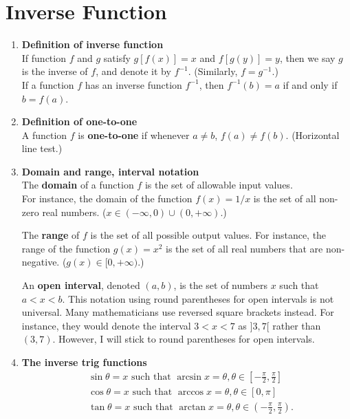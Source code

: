 \section{Inverse Function}
\begin{enumerate}
    \item \textbf{Definition of inverse function}\\
        \indent If function \(f\) and \(g\) satisfy \(g[f(x)]=x\) and \(f[g(y)]=y\), then we say \(g\) is the inverse of \(f\), and denote it by \(f^{-1}\). (Similarly, \(f=g^{-1}\).)\\
        \indent If a function \(f\) has an inverse function \(f^{-1}\), then \(f^{-1}(b)=a\) if and only if \(b=f(a)\).
    \item \textbf{Definition of one-to-one}\\
        \indent A function \(f\) is \textbf{one-to-one} if whenever \(a\neq b\), \(f(a)\neq f(b)\). (Horizontal line test.)
    \item \textbf{Domain and range, interval notation}\\
        \indent The \textbf{domain} of a function \(f\) is the set of allowable input values.\\
        \indent For instance, the domain of the function \(f(x)=1/x\) is the set of all non-zero real numbers. (\(x\in(-\infty,0)\cup(0,+\infty)\).)\par
        The \textbf{range} of \(f\) is the set of all possible output values. For instance, the range of the function \(g(x)=x^2\) is the set of all real numbers that are non-negative. (\(g(x)\in[0,+\infty)\).)\par
        An \textbf{open interval}, denoted \((a,b)\), is the set of numbers \(x\) such that \(a<x<b\). This notation using round parentheses for open intervals is not universal. Many mathematicians use reversed square brackets instead. For instance, they would denote the interval \(3<x<7\) as \(]3,7[\) rather than \((3,7)\). However, I will stick to round parentheses for open intervals.
    \item \textbf{The inverse trig functions}
        \begin{align*}
            & \sin\theta=x\text{ such that }\arcsin x=\theta, \theta\in[-\frac{\pi}{2},\frac{\pi}{2}]\\
            & \cos\theta=x\text{ such that }\arccos x=\theta, \theta\in[0,\pi]\\
            & \tan\theta=x\text{ such that }\arctan x=\theta, \theta\in(-\frac{\pi}{2},\frac{\pi}{2}).

\end{align*}
\end{enumerate}
